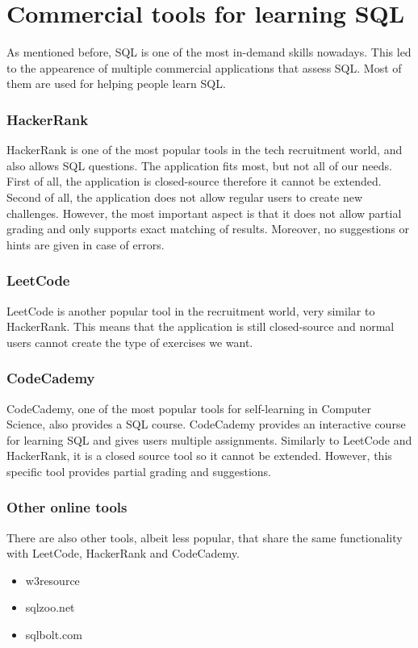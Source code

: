 \section{Commercial tools for learning SQL} \label{ch:lit:sec:tutor:comercial}

As mentioned before, SQL is one of the most in-demand skills
nowadays. This led to the appearence of multiple commercial 
applications that assess SQL. Most of them are used for helping people
learn SQL.

\subsubsection{HackerRank}
HackerRank is one of the most popular tools in the tech recruitment world,
and also allows SQL questions. The application fits most, but not all of our
needs. First of all, the application is closed-source therefore it cannot be extended. Second of all, the application does not allow regular
users to create new challenges. However, the most important aspect is
that it does not allow partial grading and only supports exact matching
of results. Moreover, no suggestions or hints are given in case of errors.

\subsubsection{LeetCode}
LeetCode is another popular tool in the recruitment world, very similar to
HackerRank. This means that the application is still closed-source and
normal users cannot create the type of exercises we want.

\subsubsection{CodeCademy}
CodeCademy, one of the most popular tools for self-learning in Computer
Science, also provides a SQL course. CodeCademy provides an interactive
course for learning SQL and gives users multiple assignments.
Similarly to LeetCode and HackerRank, it is a closed source tool so it cannot be
extended. However, this specific tool provides partial grading and suggestions.

\subsubsection{Other online tools}
There are also other tools, albeit less popular, that share the same functionality with LeetCode, HackerRank and CodeCademy.
\begin{itemize}
    \item w3resource
    \item sqlzoo.net
    \item sqlbolt.com
\end{itemize}

